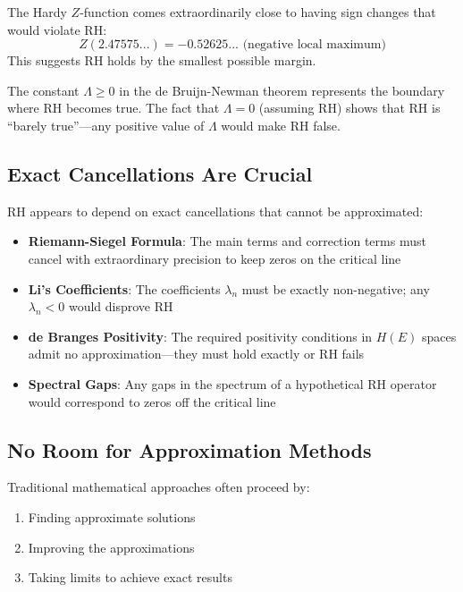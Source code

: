 \begin{example}
The Hardy $Z$-function comes extraordinarily close to having sign changes that would violate RH:
\begin{equation}
Z(2.47575...) = -0.52625... \text{ (negative local maximum)}
\end{equation}
This suggests RH holds by the smallest possible margin.
\end{example}

\begin{example}
The constant $\Lambda \geq 0$ in the de Bruijn-Newman theorem represents the boundary where RH becomes true. The fact that $\Lambda = 0$ (assuming RH) shows that RH is ``barely true''—any positive value of $\Lambda$ would make RH false.
\end{example}

\subsection{Exact Cancellations Are Crucial}
\label{subsec:exact_cancellations}

RH appears to depend on exact cancellations that cannot be approximated:

\begin{itemize}
\item \textbf{Riemann-Siegel Formula}: The main terms and correction terms must cancel with extraordinary precision to keep zeros on the critical line

\item \textbf{Li's Coefficients}: The coefficients $\lambda_n$ must be exactly non-negative; any $\lambda_n < 0$ would disprove RH

\item \textbf{de Branges Positivity}: The required positivity conditions in $H(E)$ spaces admit no approximation—they must hold exactly or RH fails

\item \textbf{Spectral Gaps}: Any gaps in the spectrum of a hypothetical RH operator would correspond to zeros off the critical line
\end{itemize}

\subsection{No Room for Approximation Methods}
\label{subsec:no_approximation}

Traditional mathematical approaches often proceed by:
\begin{enumerate}
\item Finding approximate solutions
\item Improving the approximations
\item Taking limits to achieve exact results
\end{enumerate}

